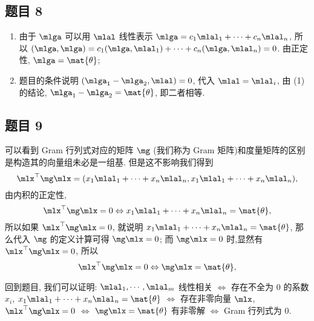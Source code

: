 \subsection*{ 题目 8 }
\begin{solution}
\begin{enumerate}
    \item 由于 $\mlga$ 可以用 $\mlal$ 线性表示 $\mlga = c_1 \mlal_1 + \cdots + c_n \mlal_n$, 所以 $(\mlga, \mlga) = c_1 (\mlga, \mlal_1) + \cdots + c_n (\mlga, \mlal_n) = 0$. 由正定性, $\mlga = \mat{\theta}$;
    \item 题目的条件说明 $(\mlga_1 - \mlga_2, \mlal) = 0$, 代入 $\mlal = \mlal_i$, 由 (1) 的结论, $\mlga_1 - \mlga_2 = \mat{\theta}$, 即二者相等.
\end{enumerate}
\end{solution}

\subsection*{ 题目 9 }
\begin{solution}

可以看到 Gram 行列式对应的矩阵 $\mg$ (我们称为 Gram 矩阵)和度量矩阵的区别是构造其的向量组未必是一组基. 但是这不影响我们得到
\[
\mlx^\top \mg \mlx = (x_1 \mlal_1 + \cdots + x_n \mlal_n, x_1 \mlal_1 + \cdots + x_n \mlal_n),
\]
由内积的正定性, 
\[
    \mlx^\top \mg \mlx = 0 \Leftrightarrow x_1 \mlal_1 + \cdots + x_n \mlal_n = \mat{\theta},
\]
所以如果 $ \mlx^\top \mg \mlx = 0$, 就说明 $x_1 \mlal_1 + \cdots + x_n \mlal_n = \mat{\theta}$, 那么代入 $\mg$ 的定义计算可得 $\mg \mlx = 0$; 而 $\mg \mlx = 0$ 时,显然有 $ \mlx^\top \mg \mlx = 0$, 所以
\[
    \mlx^\top \mg \mlx = 0 \Leftrightarrow \mg \mlx = \mat{\theta}, 
\]

回到题目, 我们可以证明: $\mlal_1, \cdots, \mlal_m$ 线性相关 $\Leftrightarrow$ 存在不全为 $0$ 的系数 $x_i$, $x_1 \mlal_1 + \cdots + x_n \mlal_n = \mat{\theta}$ $\Leftrightarrow$ 存在非零向量 $\mlx$, $\mlx^\top \mg \mlx = 0$ $\Leftrightarrow$ $\mg \mlx = \mat{\theta}$ 有非零解 $\Leftrightarrow$ Gram 行列式为 $0$.
\end{solution}


